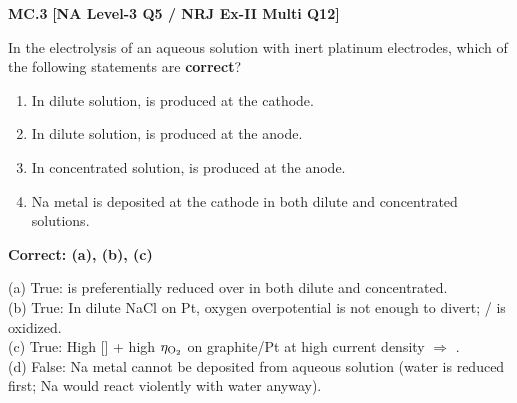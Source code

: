 \begin{problembox}
\textbf{MC.3} \hfill \textbf{[NA Level-3 Q5 / NRJ Ex-II Multi Q12]}

In the electrolysis of an aqueous  solution with inert platinum electrodes, which of the following statements are \textbf{correct}?
\begin{enumerate}[label=(\alph*)]
    \item In dilute solution,  is produced at the cathode.
    \item In dilute solution,  is produced at the anode.
    \item In concentrated solution,  is produced at the anode.
    \item Na metal is deposited at the cathode in both dilute and concentrated solutions.
\end{enumerate}
\end{problembox}
\begin{solution}
\textbf{Correct: (a), (b), (c)}

(a) True:  is preferentially reduced over  in both dilute and concentrated. \checkmark\\
(b) True: In dilute NaCl on Pt, oxygen overpotential is not enough to divert; / is oxidized. \checkmark\\
(c) True: High [] + high $\eta_{\ce{O2}}$ on graphite/Pt at high current density $\Rightarrow$ . \checkmark\\
(d) False: Na metal cannot be deposited from aqueous solution (water is reduced first; Na would react violently with water anyway). \texttimes
\end{solution}

